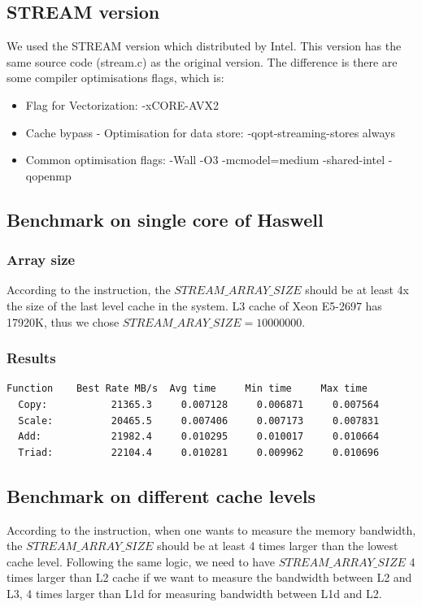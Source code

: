 \documentclass[article]{scrartcl}
\begin{document}
\subsection{STREAM version}
We used the STREAM version which distributed by Intel\cite{stream02}. This version has the same source code (stream.c) as the original version. The difference is there are some compiler optimisations flags, which is:
\begin{itemize}
  \item Flag for Vectorization: -xCORE-AVX2
  \item Cache bypass - Optimisation for data store: -qopt-streaming-stores always
  \item Common optimisation flags: -Wall -O3 -mcmodel=medium -shared-intel -qopenmp
\end{itemize}

\subsection{Benchmark on single core of Haswell}
\subsubsection{Array size}
According to the instruction, the $STREAM\_ARRAY\_SIZE$ should be at least 4x the size of the last level cache in the system. L3 cache of Xeon E5-2697 has 17920K, thus we chose $STREAM\_ARAY\_SIZE=10000000$.
\subsubsection{Results}
\begin{lstlisting}[frame=single]
  Function    Best Rate MB/s  Avg time     Min time     Max time
  Copy:           21365.3     0.007128     0.006871     0.007564
  Scale:          20465.5     0.007406     0.007173     0.007831
  Add:            21982.4     0.010295     0.010017     0.010664
  Triad:          22104.4     0.010281     0.009962     0.010696
\end{lstlisting}

\subsection{Benchmark on different cache levels}
According to the instruction, when one wants to measure the memory bandwidth, the $STREAM\_ARRAY\_SIZE$ should be at least 4 times larger than the lowest cache level. Following the same logic, we need to have $STREAM\_ARRAY\_SIZE$ 4 times larger than L2 cache if we want to measure the bandwidth between L2 and L3, 4 times larger than L1d for measuring bandwidth between L1d and L2.  
\end{document}
